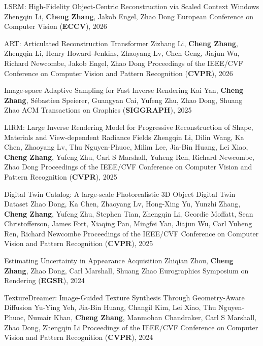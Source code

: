 
\begin{cvpublications}{}
    \cvpublication
	{LSRM: High-Fidelity Object-Centric Reconstruction via Scaled Context Windows}
	{Zhengqin Li, \textbf{Cheng Zhang}, Jakob Engel, Zhao Dong}
	{European Conference on Computer Vision (\textbf{ECCV}), 2026}
	{}

    \cvpublication
	{ART: Articulated Reconstruction Transformer}
	{Zizhang Li, \textbf{Cheng Zhang}, Zhengqin Li, Henry Howard-Jenkins, Zhaoyang Lv, Chen Geng, Jiajun Wu, Richard Newcombe, Jakob Engel, Zhao Dong}
	{Proceedings of the IEEE/CVF Conference on Computer Vision and Pattern Recognition (\textbf{CVPR}), 2026}
	{}

    \cvpublication
	{Image-space Adaptive Sampling for Fast Inverse Rendering}
	{Kai Yan, \textbf{Cheng Zhang}, Sébastien Speierer, Guangyan Cai, Yufeng Zhu, Zhao Dong, Shuang Zhao}
	{ACM Transactions on Graphics (\textbf{SIGGRAPH}), 2025}
	{}
	
	
    \cvpublication
	{LIRM: Large Inverse Rendering Model for Progressive Reconstruction of Shape, Materials and View-dependent Radiance Fields}
	{Zhengqin Li, Dilin Wang, Ka Chen, Zhaoyang Lv, Thu Nguyen-Phuoc, Milim Lee, Jia-Bin Huang, Lei Xiao, \textbf{Cheng Zhang}, Yufeng Zhu, Carl S Marshall, Yuheng Ren, Richard Newcombe, Zhao Dong}
	{Proceedings of the IEEE/CVF Conference on Computer Vision and Pattern Recognition (\textbf{CVPR}), 2025}
	{}	
	
    \cvpublication
	{Digital Twin Catalog: A large-scale Photorealistic 3D Object Digital Twin Dataset}
	{Zhao Dong, Ka Chen, Zhaoyang Lv, Hong-Xing Yu, Yunzhi Zhang, \textbf{Cheng Zhang}, Yufeng Zhu, Stephen Tian, Zhengqin Li, Geordie Moffatt, Sean Christofferson, James Fort, Xiaqing Pan, Mingfei Yan, Jiajun Wu, Carl Yuheng Ren, Richard Newcombe}
	{Proceedings of the IEEE/CVF Conference on Computer Vision and Pattern Recognition (\textbf{CVPR}), 2025}
	{}	

    \cvpublication
	{Estimating Uncertainty in Appearance Acquisition}
	{Zhiqian Zhou, \textbf{Cheng Zhang}, Zhao Dong, Carl Marshall, Shuang Zhao}
	{Eurographics Symposium on Rendering (\textbf{EGSR}), 2024}
	{}	
	
    \cvpublication
	{TextureDreamer: Image-Guided Texture Synthesis Through Geometry-Aware Diffusion}
	{Yu-Ying Yeh, Jia-Bin Huang, Changil Kim, Lei Xiao, Thu Nguyen-Phuoc, Numair Khan, \textbf{Cheng Zhang}, Manmohan Chandraker, Carl S Marshall, Zhao Dong, Zhengqin Li}
	{Proceedings of the IEEE/CVF Conference on Computer Vision and Pattern Recognition (\textbf{CVPR}), 2024}
	{}
	

\end{cvpublications}
